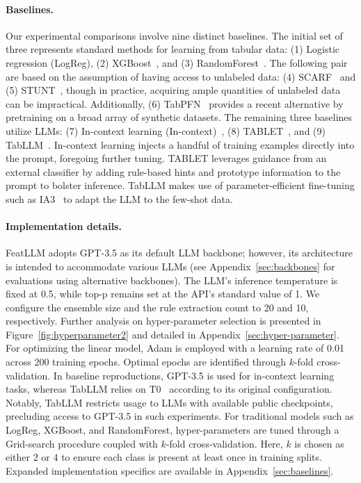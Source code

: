 \vspace*{-0.12in}
\paragraph{Baselines.}
Our experimental comparisons involve nine distinct baselines. The initial set of three represents standard methods for learning from tabular data: (1) Logistic regression (LogReg), (2) XGBoost~\cite{chen2016xgboost}, and (3) RandomForest~\cite{ho1995random}. The following pair are based on the assumption of having access to unlabeled data: (4) SCARF~\cite{bahri2022scarf} and (5) STUNT~\cite{nam2023stunt}, though in practice, acquiring ample quantities of unlabeled data can be impractical. Additionally, (6) TabPFN~\cite{hollmann2022tabpfn} provides a recent alternative by pretraining on a broad array of synthetic datasets. The remaining three baselines utilize LLMs: (7) In-context learning (In-context)~\cite{wei2022emergent}, (8) TABLET~\cite{slack2023tablet}, and (9) TabLLM~\cite{hegselmann2023tabllm}. In-context learning injects a handful of training examples directly into the prompt, foregoing further tuning. TABLET leverages guidance from an external classifier by adding rule-based hints and prototype information to the prompt to bolster inference. TabLLM makes use of parameter-efficient fine-tuning such as IA3~\cite{liu2022few} to adapt the LLM to the few-shot data.

\vspace*{-0.12in}
\paragraph{Implementation details.}
\textsf{FeatLLM} adopts GPT-3.5 as its default LLM backbone; however, its architecture is intended to accommodate various LLMs (see Appendix~\ref{sec:backbones} for evaluations using alternative backbones). The LLM's inference temperature is fixed at 0.5, while top-p remains set at the API’s standard value of 1. We configure the ensemble size and the rule extraction count to 20 and 10, respectively. Further analysis on hyper-parameter selection is presented in Figure~\ref{fig:hyperparameter2} and detailed in Appendix~\ref{sec:hyper-parameter}. For optimizing the linear model, Adam is employed with a learning rate of 0.01 across 200 training epochs. Optimal epochs are identified through $k$-fold cross-validation. In baseline reproductions, GPT-3.5 is used for in-context learning tasks, whereas TabLLM relies on T0~\cite{sanh2022multitask} according to its original configuration. Notably, TabLLM restricts usage to LLMs with available public checkpoints, precluding access to GPT-3.5 in such experiments. For traditional models such as LogReg, XGBoost, and RandomForest, hyper-parameters are tuned through a Grid-search procedure coupled with $k$-fold cross-validation. Here, $k$ is chosen as either 2 or 4 to ensure each class is present at least once in training splits. Expanded implementation specifics are available in Appendix~\ref{sec:baselines}.

